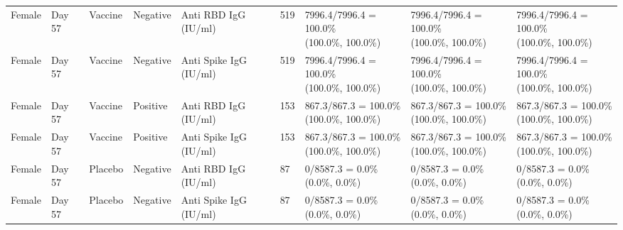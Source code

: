 \documentclass[]{book}
\theoremstyle{definition}
\theoremstyle{definition}
\theoremstyle{definition}
\newcommand{\1}{\mathbbm{1}}
\begin{document}
\begin{landscape}
\begin{ThreePartTable}
\begin{longtable}[t]{>{\raggedright\arraybackslash}p{2.7cm}llllllll}
\hspace{1em}Female & Day 57 & Vaccine & Negative & Anti RBD IgG (IU/ml) & 519 & \makecell[l]{7996.4/7996.4 = 100.0\%\\(100.0\%, 100.0\%)} & \makecell[l]{7996.4/7996.4 = 100.0\%\\(100.0\%, 100.0\%)} & \makecell[l]{7996.4/7996.4 = 100.0\%\\(100.0\%, 100.0\%)}\\
\hspace{1em}Female & Day 57 & Vaccine & Negative & Anti Spike IgG (IU/ml) & 519 & \makecell[l]{7996.4/7996.4 = 100.0\%\\(100.0\%, 100.0\%)} & \makecell[l]{7996.4/7996.4 = 100.0\%\\(100.0\%, 100.0\%)} & \makecell[l]{7996.4/7996.4 = 100.0\%\\(100.0\%, 100.0\%)}\\
\hspace{1em}Female & Day 57 & Vaccine & Positive & Anti RBD IgG (IU/ml) & 153 & \makecell[l]{867.3/867.3 = 100.0\%\\(100.0\%, 100.0\%)} & \makecell[l]{867.3/867.3 = 100.0\%\\(100.0\%, 100.0\%)} & \makecell[l]{867.3/867.3 = 100.0\%\\(100.0\%, 100.0\%)}\\
\hspace{1em}Female & Day 57 & Vaccine & Positive & Anti Spike IgG (IU/ml) & 153 & \makecell[l]{867.3/867.3 = 100.0\%\\(100.0\%, 100.0\%)} & \makecell[l]{867.3/867.3 = 100.0\%\\(100.0\%, 100.0\%)} & \makecell[l]{867.3/867.3 = 100.0\%\\(100.0\%, 100.0\%)}\\
\hspace{1em}Female & Day 57 & Placebo & Negative & Anti RBD IgG (IU/ml) & 87 & \makecell[l]{0/8587.3 = 0.0\%\\(0.0\%, 0.0\%)} & \makecell[l]{0/8587.3 = 0.0\%\\(0.0\%, 0.0\%)} & \makecell[l]{0/8587.3 = 0.0\%\\(0.0\%, 0.0\%)}\\
\hspace{1em}Female & Day 57 & Placebo & Negative & Anti Spike IgG (IU/ml) & 87 & \makecell[l]{0/8587.3 = 0.0\%\\(0.0\%, 0.0\%)} & \makecell[l]{0/8587.3 = 0.0\%\\(0.0\%, 0.0\%)} & \makecell[l]{0/8587.3 = 0.0\%\\(0.0\%, 0.0\%)}\\

\end{longtable}
\end{ThreePartTable}
\end{landscape}
\end{document}
